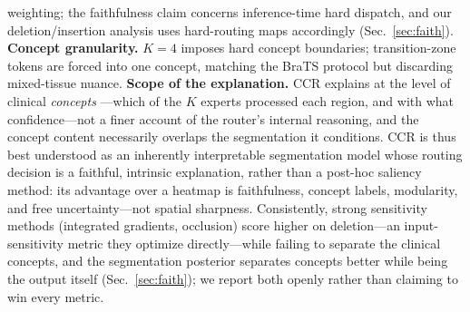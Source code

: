 \documentclass[runningheads]{llncs}
\begin{document}
weighting; the faithfulness claim concerns inference-time hard dispatch, and our
deletion/insertion analysis uses hard-routing maps accordingly (Sec.~\ref{sec:faith}).
\textbf{Concept granularity.} $K{=}4$ imposes hard concept boundaries; transition-zone
tokens are forced into one concept, matching the BraTS protocol but discarding mixed-tissue
nuance.
\textbf{Scope of the explanation.} CCR explains at the level of clinical \emph{concepts}
---which of the $K$ experts processed each region, and with what confidence---not a finer
account of the router's internal reasoning, and the concept content necessarily overlaps the
segmentation it conditions. CCR is thus best understood as an inherently interpretable
segmentation model whose routing decision is a faithful, intrinsic explanation, rather than a
post-hoc saliency method: its advantage over a heatmap is faithfulness, concept labels,
modularity, and free uncertainty---not spatial sharpness. Consistently, strong sensitivity
methods (integrated gradients, occlusion) score higher on deletion---an input-sensitivity
metric they optimize directly---while failing to separate the clinical concepts, and the
segmentation posterior separates concepts better while being the output itself
(Sec.~\ref{sec:faith}); we report both openly rather than claiming to win every metric.

\end{document}
